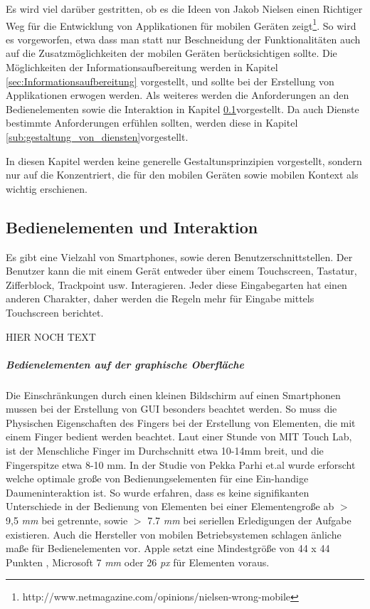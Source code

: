 Es wird viel darüber gestritten, ob es die Ideen von Jakob Nielsen einen Richtiger Weg für die Entwicklung von Applikationen für mobilen Geräten zeigt\footnote{http://www.netmagazine.com/opinions/nielsen-wrong-mobile}. So wird es vorgeworfen, etwa dass man statt nur Beschneidung der Funktionalitäten auch auf die Zusatzmöglichkeiten der mobilen Geräten berücksichtigen sollte. Die Möglichkeiten der Informationsaufbereitung werden in Kapitel \ref{sec:Informationsaufbereitung} vorgestellt, und sollte bei der Erstellung von Applikationen erwogen werden. Als weiteres werden die Anforderungen an den Bedienelementen sowie die Interaktion in Kapitel \ref{sub:Benutzerschnittstellen}vorgestellt. Da auch Dienste bestimmte Anforderungen erfühlen sollten, werden diese in Kapitel \ref{sub:gestaltung_von_diensten}vorgestellt.

In diesen Kapitel werden keine generelle Gestaltunsprinzipien vorgestellt, sondern nur auf die Konzentriert, die für den mobilen Geräten sowie mobilen Kontext als wichtig erschienen.

\subsection{Bedienelementen und Interaktion}
\label{sub:Benutzerschnittstellen}

Es gibt eine Vielzahl von Smartphones, sowie deren Benutzerschnittstellen. Der Benutzer kann die mit einem Gerät entweder über einem Touchscreen, Tastatur, Zifferblock, Trackpoint usw. Interagieren. Jeder diese Eingabegarten hat einen anderen Charakter, daher werden die Regeln mehr für Eingabe mittels Touchscreen berichtet.

HIER NOCH TEXT

\subparagraph{Bedienelementen auf der graphische Oberfläche} 
\label{subp:gro_ere_interface_elementen}

Die Einschränkungen durch einen kleinen Bildschirm auf einen Smartphonen mussen bei der Erstellung von GUI besonders beachtet werden. So muss die Physischen Eigenschaften des Fingers  bei der Erstellung von Elementen, die mit einem Finger bedient werden beachtet. Laut einer Stunde von MIT Touch Lab, ist der Menschliche Finger im Durchschnitt etwa 10-14mm breit, und die Fingerspitze etwa 8-10 mm\cite{Srinivasan:2003uu}. In der Studie von Pekka Parhi et.al \cite{Parhi:2006gh} wurde erforscht welche optimale große von Bedienungselementen für eine Ein-handige Daumeninteraktion ist. So wurde erfahren, dass es keine signifikanten Unterschiede in der Bedienung von Elementen bei einer Elementengroße ab $>$ 9,5 \textit{mm} bei getrennte, sowie $>$ 7.7 \textit{mm} bei seriellen Erledigungen der Aufgabe existieren. Auch die Hersteller von mobilen Betriebsystemen schlagen änliche maße für Bedienelementen vor. Apple setzt eine Mindestgröße von 44 x 44 Punkten \cite{Apple}, Microsoft 7 \textit{mm} oder 26 \textit{px}\cite{lukeGUI} für Elementen voraus.

